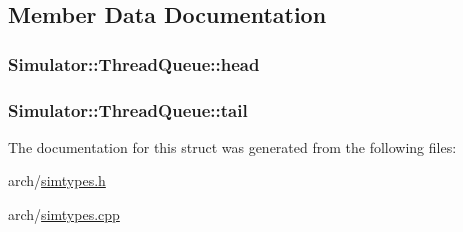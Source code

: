 \subsection{Member Data Documentation}
\hypertarget{struct_simulator_1_1_thread_queue_a8fdeab99918a1faa053e831ac857b05c}{
\subsubsection[{head}]{ Simulator\+::\+Thread\+Queue\+::head}}\label{struct_simulator_1_1_thread_queue_a8fdeab99918a1faa053e831ac857b05c}
\hypertarget{struct_simulator_1_1_thread_queue_a88bf60f282377201a9bc565282bbf935}{
\subsubsection[{tail}]{ Simulator\+::\+Thread\+Queue\+::tail}}\label{struct_simulator_1_1_thread_queue_a88bf60f282377201a9bc565282bbf935}


The documentation for this struct was generated from the following files\+:\begin{DoxyCompactItemize}
\item 
arch/\hyperlink{simtypes_8h}{simtypes.\+h}\item 
arch/\hyperlink{simtypes_8cpp}{simtypes.\+cpp}\end{DoxyCompactItemize}
